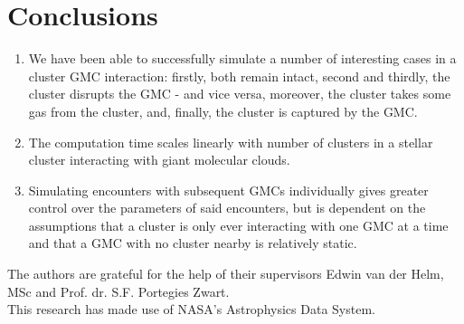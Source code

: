 \documentclass{aa}
\begin{document}
\section{Conclusions}\label{sec:conclusions}
\begin{enumerate}
    \item We have been able to successfully simulate a number of interesting cases in a cluster GMC interaction: firstly, both remain intact, second and thirdly, the cluster disrupts the GMC - and vice versa, moreover, the cluster takes some gas from the cluster, and, finally, the cluster is captured by the GMC.
    \item The computation time scales linearly with number of clusters in a stellar cluster interacting with giant molecular clouds.
    \item Simulating encounters with subsequent GMCs individually gives greater control over the parameters of said encounters, but is dependent on the assumptions that a cluster is only ever interacting with one GMC at a time and that a GMC with no cluster nearby is relatively static.
\end{enumerate}


\begin{acknowledgements}
The authors are grateful for the help of their supervisors Edwin van der Helm, MSc and Prof. dr. S.F. Portegies Zwart. \\

This research has made use of NASA's Astrophysics Data System.
\end{acknowledgements}





\end{document}
